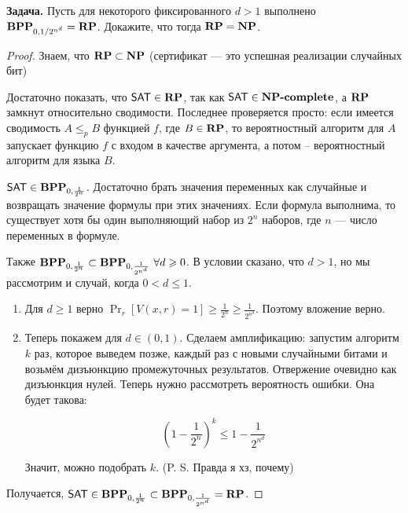 \textbf{Задача.}
Пусть для некоторого фиксированного $d > 1$ выполнено $\textbf{BPP}_{0,1/2^{n^d}}=\textbf{RP}$. Докажите, что тогда $\textbf{RP} =\textbf{NP}$.

\begin{proof}
Знаем, что $\textbf{RP}\subset\textbf{NP}$ (сертификат --- это успешная реализации случайных бит)

Достаточно показать, что $\mathsf{SAT}\in\textbf{RP}$, так как $\mathsf{SAT} \in \textbf{NP-complete}$, а $\textbf{RP}$ замкнут относительно сводимости. Последнее проверяется просто: если имеется сводимость $A \le_p B$ функцией $f$, где $B \in \textbf{RP}$, то вероятностный алгоритм для $A$ запускает функцию $f$ с входом в качестве аргумента, а потом -- вероятностный алгоритм для языка $B$.

$\mathsf{SAT} \in \textbf{BPP}_{0,\frac{1}{2^n}}$. Достаточно брать значения переменных как случайные и возвращать значение формулы при этих значениях. Если формула выполнима, то существует хотя бы один выполняющий набор из $2^n$ наборов, где $n$ --- число переменных в формуле.

Также $\textbf{BPP}_{0,\frac{1}{2^n}} \subset \textbf{BPP}_{0,\frac{1}{2^{n^d}}} \ \forall d \geqslant 0$. В условии сказано, что $d > 1$, но мы рассмотрим и случай, когда $0 < d \le 1$.

\begin{enumerate}
    \item Для $d \ge 1$ верно $\Pr_r[V(x, r) = 1] \ge \frac{1}{2^n} \ge \frac{1}{2^{n^d}}$. Поэтому вложение верно.
    
    \item Теперь покажем для $d \in (0,1)$. Сделаем амплификацию: запустим алгоритм $k$ раз, которое выведем позже, каждый раз с новыми случайными битами и возьмём дизъюнкцию промежуточных результатов. Отвержение очевидно как дизъюнкция нулей. Теперь нужно рассмотреть вероятность ошибки. Она будет такова:
    
    \[\left(1-\frac{1}{2^n}\right)^k \le 1 - \frac{1}{2^{n^d}}\]
    
    Значит, можно подобрать $k$. (P. S. Правда я хз, почему)
\end{enumerate}
    
Получается, $\mathsf{SAT} \in \textbf{BPP}_{0,\frac{1}{2^n}} \subset \textbf{BPP}_{0,\frac{1}{2^{n^d}}} = \textbf{RP}$.

\end{proof}
